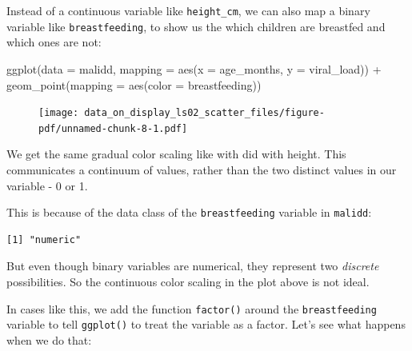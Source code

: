 \documentclass[
  letterpaper,
  DIV=11,
  numbers=noendperiod]{scrreprt}
\newenvironment{Shaded}{\begin{snugshade}}{\end{snugshade}}
\newcommand{\AttributeTok}[1]{\textcolor[rgb]{0.40,0.45,0.13}{#1}}
\newcommand{\FunctionTok}[1]{\textcolor[rgb]{0.28,0.35,0.67}{#1}}
\newcommand{\NormalTok}[1]{\textcolor[rgb]{0.00,0.23,0.31}{#1}}
\newcommand{\SpecialCharTok}[1]{\textcolor[rgb]{0.37,0.37,0.37}{#1}}
\begin{document}
Instead of a continuous variable like \texttt{height\_cm}, we can also
map a binary variable like \texttt{breastfeeding}, to show us the which
children are breastfed and which ones are not:

\begin{Shaded}
\begin{Highlighting}[]
\FunctionTok{ggplot}\NormalTok{(}\AttributeTok{data =}\NormalTok{ malidd, }
       \AttributeTok{mapping =} \FunctionTok{aes}\NormalTok{(}\AttributeTok{x =}\NormalTok{ age\_months, }
                     \AttributeTok{y =}\NormalTok{ viral\_load)) }\SpecialCharTok{+} 
  \FunctionTok{geom\_point}\NormalTok{(}\AttributeTok{mapping =} \FunctionTok{aes}\NormalTok{(}\AttributeTok{color =}\NormalTok{ breastfeeding))}
\end{Highlighting}
\end{Shaded}

\begin{figure}[H]

{\centering \texttt{[image: data\_on\_display\_ls02\_scatter\_files/figure-pdf/unnamed-chunk-8-1.pdf]}

}

\end{figure}

We get the same gradual color scaling like with did with height. This
communicates a continuum of values, rather than the two distinct values
in our variable - 0 or 1.

This is because of the data class of the \texttt{breastfeeding} variable
in \texttt{malidd}:

\begin{Shaded}
\end{Shaded}

\begin{verbatim}
[1] "numeric"
\end{verbatim}

But even though binary variables are numerical, they represent two
\emph{discrete} possibilities. So the continuous color scaling in the
plot above is not ideal.

In cases like this, we add the function \texttt{factor()} around the
\texttt{breastfeeding} variable to tell \texttt{ggplot()} to treat the
variable as a factor. Let's see what happens when we do that:
\end{document}
